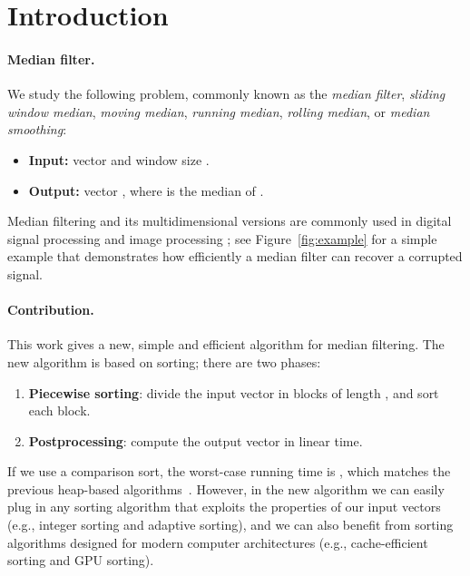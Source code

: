 \documentclass[a4paper,11pt]{article}
\begin{document}
\thispagestyle{empty}
\clearpage
\setcounter{page}{1}

\section{Introduction}\label{sec:intro}

\paragraph{Median filter.}

We study the following problem, commonly known as the \emph{median filter}, \emph{sliding window median}, \emph{moving median}, \emph{running median}, \emph{rolling median}, or \emph{median smoothing}:
\begin{itemize}[noitemsep]
    \item \textbf{Input:} vector  and window size .
    \item \textbf{Output:} vector , where  is the median of .
\end{itemize}
Median filtering and its multidimensional versions are commonly used in digital signal processing  and image processing ; see Figure~\ref{fig:example} for a simple example that demonstrates how efficiently a median filter can recover a corrupted signal.

\paragraph{Contribution.}

This work gives a new, simple and efficient algorithm for median filtering. The new algorithm is based on sorting; there are two phases:
\begin{enumerate}[noitemsep]
    \item \textbf{Piecewise sorting}: divide the input vector in  blocks of length , and sort each block.
    \item \textbf{Postprocessing}: compute the output vector in linear time.
\end{enumerate}
If we use a comparison sort, the worst-case running time is , which matches the previous heap-based algorithms~\cite{astola89median,juhola91comparison,hardle95median-smooth}. However, in the new algorithm we can easily plug in any sorting algorithm that exploits the properties of our input vectors (e.g., integer sorting and adaptive sorting), and we can also benefit from sorting algorithms designed for modern computer architectures (e.g., cache-efficient sorting and GPU sorting).
\end{document}
